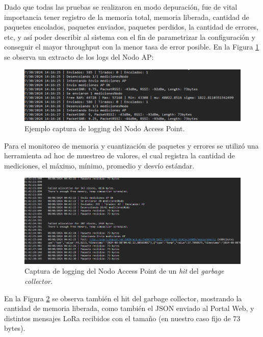 Dado que todas las pruebas se realizaron en modo depuración, fue de vital importancia tener registro de la memoria total, memoria liberada, cantidad de paquetes encolados, paquetes enviados, paquetes perdidos, la cantidad de errores, etc, y así poder describir al sistema con el fin de parametrizar la configuración y conseguir el mayor throughput con la menor tasa de error posible. En la Figura \ref{fig:pruebas_firmware_2} se observa un extracto de los logs del Nodo AP:

\begin{figure}[H]
    \centering
    \includegraphics[width=1\linewidth]{Figures/Firmware/pruebas_2.png}
    \caption{Ejemplo captura de logging del Nodo Access Point.}
    \label{fig:pruebas_firmware_2}
\end{figure}

Para el monitoreo de memoria y cuantización de paquetes y errores se utilizó una herramienta ad hoc de muestreo de valores, el cual registra la cantidad de mediciones, el máximo, mínimo, promedio y desvío estándar.

\begin{figure}[H]
    \centering
    \includegraphics[width=1\linewidth]{Figures/Firmware/pruebas_1.png}
    \caption{Captura de logging del Nodo Access Point de un \textit{hit} del \textit{garbage collector}.}
    \label{fig:pruebas_firmware_1}
\end{figure}

 En la Figura \ref{fig:pruebas_firmware_1} se observa también el hit del garbage collector, mostrando la cantidad de memoria liberada, como también el JSON enviado al Portal Web, y distintos mensajes LoRa recibidos con el tamaño (en nuestro caso fijo de 73 bytes).


